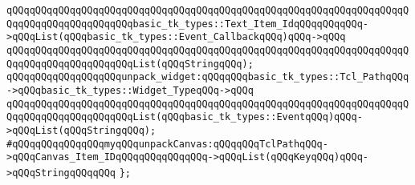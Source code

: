 \verb|qQQqqQQqqQQqqQQqqQQqqQQqqQQqqQQqqQQqqQQqqQQqqQQqqQQqqQQqqQQqqQQqqQQqqQQqqQQqqQQqqQQqqQQqqQQqbasic_tk_types::Text_Item_IdqQQqqQQqqQQq->qQQqList(qQQqbasic_tk_types::Event_CallbackqQQq)qQQq->qQQq|\newline
\verb|qQQqqQQqqQQqqQQqqQQqqQQqqQQqqQQqqQQqqQQqqQQqqQQqqQQqqQQqqQQqqQQqqQQqqQQqqQQqqQQqqQQqqQQqqQQqList(qQQqStringqQQq);|\newline
\newline
\verb|qQQqqQQqqQQqqQQqqQQqunpack_widget:qQQqqQQqbasic_tk_types::Tcl_PathqQQq->qQQqbasic_tk_types::Widget_TypeqQQq->qQQq|\newline
\verb|qQQqqQQqqQQqqQQqqQQqqQQqqQQqqQQqqQQqqQQqqQQqqQQqqQQqqQQqqQQqqQQqqQQqqQQqqQQqqQQqqQQqqQQqqQQqList(qQQqbasic_tk_types::EventqQQq)qQQq->qQQqList(qQQqStringqQQq);|\newline
\newline
\verb|#qQQqqQQqqQQqqQQqmyqQQqunpackCanvas:qQQqqQQqTclPathqQQq->qQQqCanvas_Item_IDqQQqqQQqqQQqqQQq->qQQqList(qQQqKeyqQQq)qQQq->qQQqStringqQQqqQQq|\newline
\verb|};|\newline

